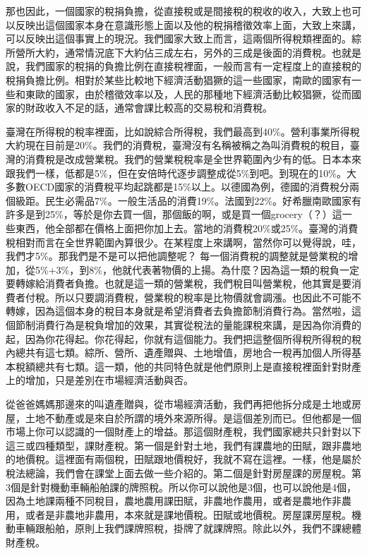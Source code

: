 \documentclass[]{ctexbook}
\begin{document}
那也因此，一個國家的稅捐負擔，從直接稅或是間接稅的稅收的收入，大致上也可以反映出這個國家本身在意識形態上面以及他的稅捐稽徵效率上面，大致上來講，可以反映出這個事實上的現況。我們國家大致上而言，這兩個所得稅類裡面的。綜所營所大約，通常情況底下大約佔三成左右，另外的三成是後面的消費稅。也就是說，我們國家的稅捐的負擔比例在直接稅裡面，一般而言有一定程度上的直接稅的稅捐負擔比例。相對於某些比較地下經濟活動猖獗的這一些國家，南歐的國家有一些和東歐的國家，由於稽徵效率以及，人民的那種地下經濟活動比較猖獗，從而國家的財政收入不足的話，通常會課比較高的交易稅和消費稅。

臺灣在所得稅的稅率裡面，比如說綜合所得稅，我們最高到40\%。營利事業所得稅大約現在目前是20\%。我們的消費稅，臺灣沒有名稱被稱之為叫消費稅的稅目，臺灣的消費稅是改成營業稅。我們的營業稅稅率是全世界範圍內少有的低。日本本來跟我們一樣，低都是5\%，但在安倍時代逐步調整成從5\%到吧。到現在的10\%。大多數OECD國家的消費稅平均起跳都是15\%以上。以德國為例，德國的消費稅分兩個級距。民生必需品7\%。一般生活品的消費19\%。法國到22\%。好希臘南歐國家有許多是到25\%，等於是你去買一個，那個飯的啊，或是買一個grocery（？）這一些東西，他全部都在價格上面把你加上去。當地的消費稅20\%或25\%。臺灣的消費稅相對而言在全世界範圍內算很少。在某程度上來講啊，當然你可以覺得說，哇，我們才5\%。那我們是不是可以把他調整呢？ 每一個消費稅的調整就是營業稅的增加，從5\%+3\%，到8\%，他就代表著物價的上揚。為什麼？因為這一類的稅負一定要轉嫁給消費者負擔。也就是這一類的營業稅，我們稅目叫營業稅，他其實是要消費者付稅。所以只要調消費稅，營業稅的稅率是比物價就會調漲。也因此不可能不轉嫁，因為這個本身的稅目本身就是希望消費者去負擔節制消費行為。當然啦，這個節制消費行為是稅負增加的效果，其實從稅法的量能課稅來講，是因為你消費的起，因為你花得起。你花得起，你就有這個能力。我們把這整個所得稅所得稅的稅內總共有這七類。綜所、營所、遺產贈與、土地增值，房地合一稅再加個人所得基本稅額總共有七類。這一類，他的共同特色就是他們原則上是直接稅裡面針對財產上的增加，只是差別在市場經濟活動與否。

從爸爸媽媽那邊來的叫遺產贈與，從市場經濟活動，我們再把他拆分成是土地或房屋，土地不動產或是來自於所謂的境外來源所得。是這個差別而已。但他都是一個市場上你可以認識的一個財產上的增益。那這個財產稅，我們國家總共只針對以下這三或四種類型，課財產稅。第一個是針對土地，我們有課農地的田賦，跟非農地的地價稅。這裡面有兩個稅，田賦跟地價稅好，我就不寫在這裡。一樣，他是屬於稅法總論，我們會在課堂上面去做一些介紹的。第二個是針對房屋課的房屋稅。第3個是針對機動車輛船舶課的牌照稅。所以你可以說他是3個，也可以說他是4個，因為土地課兩種不同稅目，農地農用課田賦，非農地作農用，或者是農地作非農用，或者是非農地非農用，本來就是課地價稅。田賦或地價稅。房屋課房屋稅。機動車輛跟船舶，原則上我們課牌照稅，掛牌了就課牌照。除此以外，我們不課總體財產稅。
\end{document}
